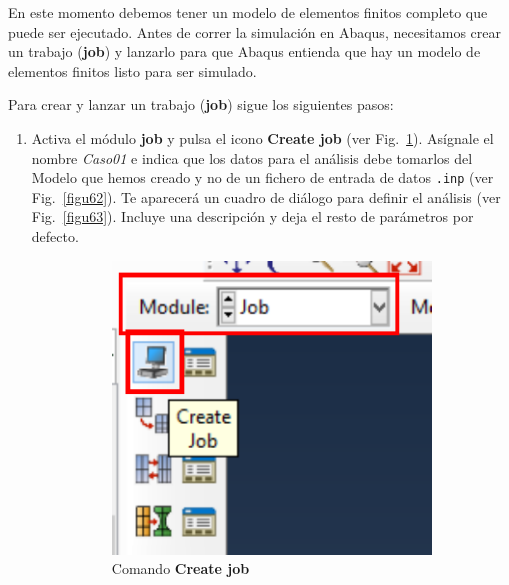 En este momento debemos tener un modelo de elementos finitos completo
que puede ser ejecutado. Antes de correr la simulación en Abaqus,
necesitamos crear un trabajo (\textbf{job}) y lanzarlo para que Abaqus
entienda que hay un modelo de elementos finitos listo para ser
simulado.

Para crear y lanzar un trabajo (\textbf{job}) sigue los siguientes
pasos:
\begin{enumerate}
\item Activa el módulo \textbf{job} y pulsa el icono \textbf{Create
    job} (ver Fig.~\ref{figu61}). Asígnale el nombre \textit{Caso01} e
  indica que los datos para el análisis debe tomarlos del Modelo que
  hemos creado y no de un fichero de entrada de datos \texttt{.inp}
  (ver Fig.~\ref{figu62}). Te aparecerá un cuadro de diálogo para
  definir el análisis (ver Fig.~\ref{figu63}). Incluye una descripción
  y deja el resto de parámetros por defecto.
  \begin{figure}[H]
    \centering
    \begin{subfigure}{0.15\textwidth}
      \includegraphics[width=\textwidth]{./body/images/imagen61.pdf}
      \caption{Comando \textbf{Create job}}
      \label{figu61}
    \end{subfigure}%
    ~ %
    \begin{subfigure}{0.33\textwidth}

\end{subfigure}
\end{figure}
\end{enumerate}
